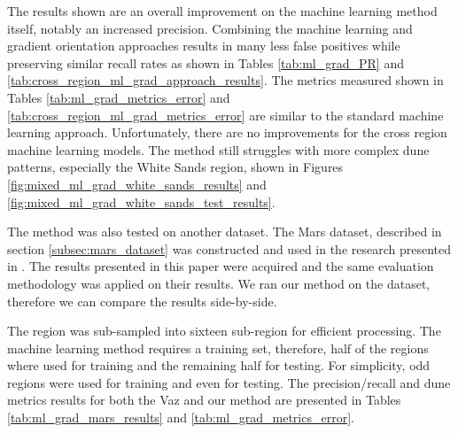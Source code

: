 The results shown are an overall improvement on the machine learning method itself, notably an increased precision. Combining the machine learning and gradient orientation approaches results in many less false positives while preserving similar recall rates as shown in Tables \ref{tab:ml_grad_PR} and \ref{tab:cross_region_ml_grad_approach_results}. The metrics measured shown in Tables \ref{tab:ml_grad_metrics_error} and \ref{tab:cross_region_ml_grad_metrics_error} are similar to the standard machine learning approach. Unfortunately, there are no improvements for the cross region machine learning models. The method still struggles with more complex dune patterns, especially the White Sands region, shown in Figures \ref{fig:mixed_ml_grad_white_sands_results} and \ref{fig:mixed_ml_grad_white_sands_test_results}.

The method was also tested on another dataset. The Mars dataset, described in section \ref{subsec:mars_dataset} was constructed and used in the research presented in \cite{vaz_object_based_dune_analysis}. The results presented in this paper were acquired and the same evaluation methodology was applied on their results. We ran our method on the dataset, therefore we can compare the results side-by-side.

The region was sub-sampled into sixteen sub-region for efficient processing. The machine learning method requires a training set, therefore, half of the regions where used for training and the remaining half for testing. For simplicity, odd regions were used for training and even for testing. The precision/recall and dune metrics results for both the Vaz and our method are presented in Tables \ref{tab:ml_grad_mars_results} and \ref{tab:ml_grad_metrics_error}.

